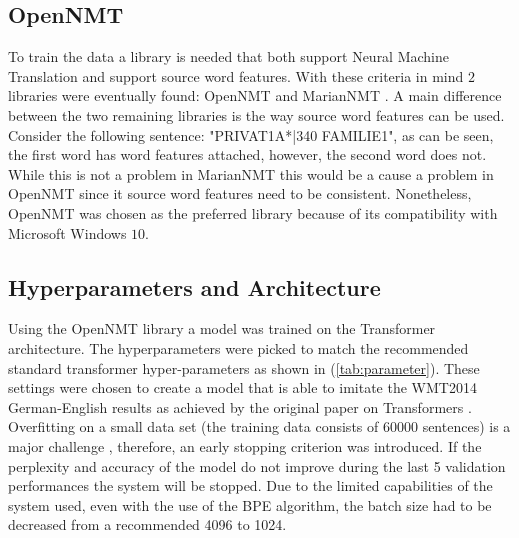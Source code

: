 \subsection{OpenNMT}
 
To train the data a library is needed that both support Neural Machine Translation and support source word features. With these criteria in mind $2$ libraries were eventually found: OpenNMT \cite{klein-etal-2017-opennmt} and MarianNMT \cite{mariannmt}. A main difference between the two remaining libraries is the way source word features can be used. Consider the following sentence: "PRIVAT1A*|340 FAMILIE1", as can be seen, the first word has word features attached, however, the second word does not. While this is not a problem in MarianNMT this would be a cause a problem in OpenNMT since it source word features need to be consistent. Nonetheless, OpenNMT was chosen as the preferred library because of its compatibility with Microsoft Windows $10$. 

\subsection{Hyperparameters and Architecture}

Using the OpenNMT library \cite{klein-etal-2017-opennmt} a model was trained on the Transformer architecture. The hyperparameters were picked to match the recommended standard transformer hyper-parameters \cite{standard_hyperparameters} as shown in (\autoref{tab:parameter}). These settings were chosen to create a model that is able to imitate the WMT2014 German-English \cite{WMT2014} results as achieved by the original paper on Transformers \cite{vaswani2017attention}. Overfitting on a small data set (the training data consists of $60000$ sentences) is a major challenge \cite{barone2017regularization}, therefore,  an early stopping criterion was introduced. If the perplexity and accuracy of the model do not improve during the last 5 validation performances the system will be stopped. Due to the limited capabilities of the system used, even with the use of the BPE algorithm, the batch size had to be decreased from a recommended 4096 to 1024.




